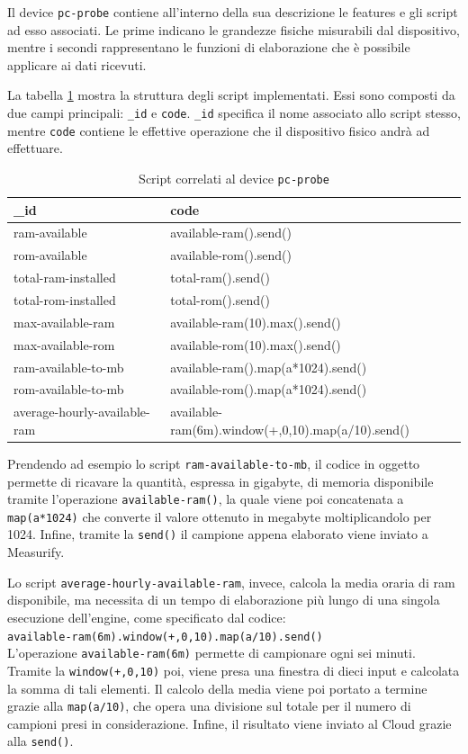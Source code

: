Il device \texttt{pc-probe} contiene all'interno della sua descrizione le features e gli script ad esso associati. Le prime indicano le grandezze fisiche misurabili dal dispositivo, mentre i secondi rappresentano le funzioni di elaborazione che è possibile applicare ai dati ricevuti. 

La tabella \ref{script} mostra la struttura degli script implementati. Essi sono composti da due campi principali: \texttt{\_id} e \texttt{code}.  \texttt{\_id} specifica il nome associato allo script stesso, mentre \texttt{code} contiene le effettive operazione che il dispositivo fisico andrà ad effettuare. 

\begin{table}[H]
	\begin{tabular}{|p{}|p{}|}
		\hline
		\textbf{\_id} & \textbf{code} \\
		\hline
		ram-available & available-ram().send()\\
		\hline
		rom-available & available-rom().send()\\
		\hline
		total-ram-installed & total-ram().send()\\
		\hline
		total-rom-installed & total-rom().send()\\
		\hline
		max-available-ram & available-ram(10).max().send()\\	
		\hline
		max-available-rom & available-rom(10).max().send()\\
		\hline	
		ram-available-to-mb & available-ram().map(a*1024).send()\\
		\hline
		rom-available-to-mb & available-rom().map(a*1024).send()\\
		\hline
		average-hourly-available-ram & available-ram(6m).window(+,0,10).map(a/10).send()\\
		\hline
	\end{tabular}
	\caption{Script correlati al device \texttt{pc-probe}}
	\label{script}
\end{table}

Prendendo ad esempio lo script \texttt{ram-available-to-mb}, il codice in oggetto permette di ricavare la quantità, espressa in gigabyte, di memoria disponibile tramite l’operazione \texttt{available-ram()}, la quale viene poi concatenata a \texttt{map(a*1024)} che converte il valore ottenuto in megabyte moltiplicandolo per 1024. Infine, tramite la \texttt{send()} il campione appena elaborato viene inviato a Measurify.

Lo script \texttt{average-hourly-available-ram}, invece, calcola la media oraria di ram disponibile, ma necessita di un tempo di elaborazione più lungo di una singola esecuzione dell'engine, come specificato dal codice:\\ \texttt{available-ram(6m).window(+,0,10).map(a/10).send()}\\ L’operazione \texttt{available-ram(6m)} permette di campionare ogni sei minuti. Tramite la \texttt{window(+,0,10)} poi, viene presa una finestra di dieci input e calcolata la somma di tali elementi. Il calcolo della media viene poi portato a termine grazie alla \texttt{map(a/10)}, che opera una divisione sul totale per il numero di campioni presi in considerazione. Infine, il risultato viene inviato al Cloud grazie alla \texttt{send()}.


